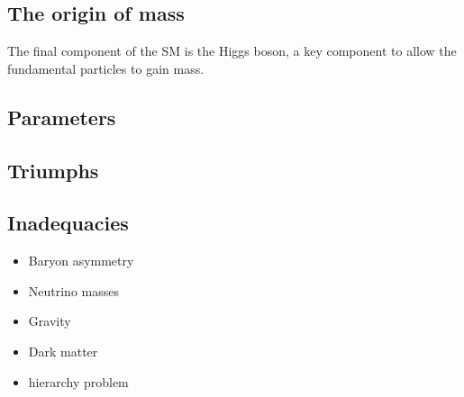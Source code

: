 \subsection{The origin of mass}
The final component of the SM is the Higgs boson, a key component to allow the fundamental particles to gain mass.

\subsection{Parameters}


\subsection{Triumphs}
\subsection{Inadequacies}
\begin{itemize}
\item Baryon asymmetry 
\item Neutrino masses
\item Gravity
\item Dark matter
\item hierarchy problem
\end{itemize}

